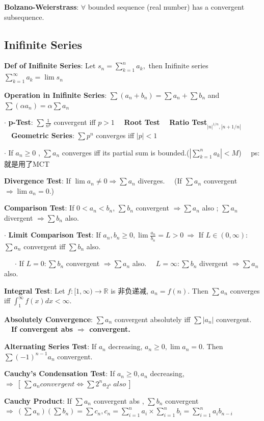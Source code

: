 \documentclass[11pt]{article}
\begin{document}
\textbf{Bolzano-Weierstrass}: $\forall$ bounded sequence (real number) has a convergent subsequence.

\subsection{Inifinite Series}

\textbf{Def of Inifinite Series}: Let $s_n=\sum\limits_{k=1}^{n}a_k,$ then Inifinite series $\sum\limits_{k=1}^{\infty}a_k=\lim s_n$

\textbf{Operation in Inifinite Series}: $\sum (a_n+b_n)=\sum a_n+\sum b_n$ and $\sum (\alpha a_n)=\alpha \sum a_n$

$\cdot$ \textbf{p-Test}: $\sum \frac{1}{n^p}$ convergent iff $p>1$ \ \ \textbf{Root Test} \ \ \textbf{Ratio Test}$_{|n|^{1/n},|n+1/n|}$ \ \ \textbf{Geometric Series}: $\sum p^n$ converges iff $|p|<1$

$\cdot$ If $a_n\geq 0$ , $\sum a_n$ converges iff its partial sum is bounded.($\left|\sum_{k=1}^{n}a_k\right|<M$) \ \ ps:就是用了MCT

\textbf{Divergence Test}: If $\lim a_n\ne 0 \Rightarrow \sum a_n$ diverges. \ \ (If $\sum a_n$ convergent $\Rightarrow \lim a_n=0.$)

\textbf{Comparison Test}: If $0<a_n<b_n$, $\sum b_n$ convergent $\Rightarrow \sum a_n$ also ; $\sum a_n$ divergent $\Rightarrow \sum b_n$ also.

$\cdot$ \textbf{Limit Comparison Test}: If $a_n,b_n\geq 0,\lim \frac{a_n}{b_n}=L>0 \ \Rightarrow$ If $L\in(0,\infty)$: $\sum a_n$ convergent iff $\sum b_n$ also.

\ \ \ $\cdot$ If $L=0 : \sum b_n$ convergent $\Rightarrow \sum a_n$ also. \ \ $L=\infty : \sum b_n$ divergent $\Rightarrow \sum a_n$ also.

\textbf{Integral Test}: Let $f:[1,\infty)\rightarrow\mathbb{R}$ is 非负递减, $a_n=f(n)$. Then $\sum a_n$ converges iff $\int_{1}^{\infty}f(x)dx<\infty.$

\textbf{Absolutely Convergence}: $\sum a_n$ convergent absolutely iff $\sum |a_n|$ convergent. \ \ \textbf{If convergent abs $\Rightarrow$ convergent.}

\textbf{Alternating Series Test}: If $a_n$ decreasing, $a_n\geq 0,\lim a_n = 0$. Then $\sum (-1)^{n-1}a_n$ convergent.

\textbf{Cauchy's Condensation Test}: If $a_n\geq 0,a_n$ decreasing, $\Rightarrow \ [\ \sum a_n convergent \Leftrightarrow \sum 2^na_{2^n} \ also \ ]$

\textbf{Cauchy Product}: If $\sum a_n$ convergent abs , $\sum b_n$ convergent $\Rightarrow \ (\sum a_n)(\sum b_n)=\sum c_n, c_n=\sum\limits_{i=1}^{n}a_i \times \sum\limits_{i=1}^{n}b_i = \sum\limits_{i=1}^{n}a_ib_{n-i}$
\end{document}

